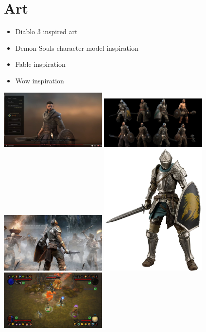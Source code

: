 \documentclass{article}
\begin{document}
\section*{Art}
\begin{itemize}
  \item Diablo 3 inspired art
  \item Demon Souls character model inspiration
  \item Fable inspiration
  \item Wow inspiration
\end{itemize}
\includegraphics[width=0.4\textwidth]{character.jpg}
\includegraphics[width=0.4\textwidth]{demon_souls_characters.jpg}
\\
\includegraphics[width=0.4\textwidth]{flute_knight_back.jpg}
\includegraphics[width=0.4\textwidth]{flute_knight_front_toy.jpg}
\\
\includegraphics[width=0.4\textwidth]{d3_couch_coop.jpg}
\end{document}
